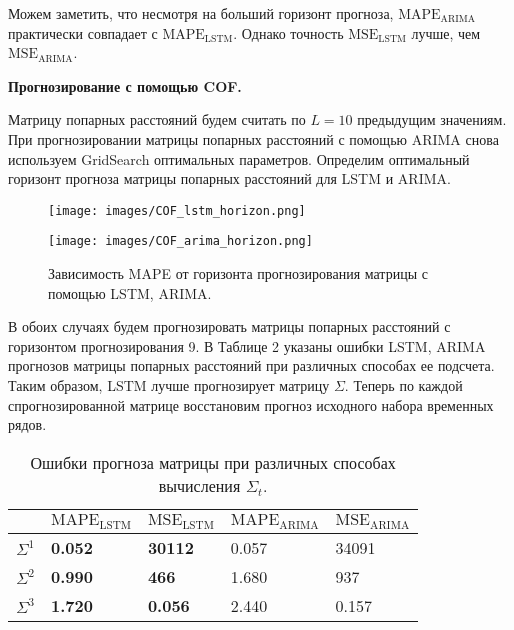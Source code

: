 \documentclass{article}
\begin{document}
Можем заметить, что несмотря на больший горизонт прогноза, $\text{MAPE}_{\text{ARIMA}}$ практически совпадает с $\text{MAPE}_{\text{LSTM}}$. Однако точность $\text{MSE}_{\text{LSTM}}$ лучше, чем $\text{MSE}_{\text{ARIMA}}$.

\textbf{Прогнозирование с помощью COF.}

Матрицу попарных расстояний будем считать по $L = 10$ предыдущим значениям. При прогнозировании матрицы попарных расстояний с помощью ARIMA снова используем GridSearch оптимальных параметров. Определим оптимальный горизонт прогноза матрицы попарных расстояний для LSTM и ARIMA.

\begin{figure}[h!]
  \begin{minipage}{0.5\textwidth}
    \centering
    \texttt{[image: images/COF\_lstm\_horizon.png]}
  \end{minipage}\hfill
  \begin{minipage}{0.5\textwidth}
    \centering
    \texttt{[image: images/COF\_arima\_horizon.png]}
  \end{minipage}
  \caption{Зависимость MAPE от горизонта прогнозирования матрицы с помощью LSTM, ARIMA.}
\end{figure}

В обоих случаях будем прогнозировать матрицы попарных расстояний с горизонтом прогнозирования 9. В Таблице 2 указаны ошибки LSTM, ARIMA прогнозов матрицы попарных расстояний при различных способах ее подсчета. Таким образом, LSTM лучше прогнозирует матрицу $\Sigma$. Теперь по каждой спрогнозированной матрице восстановим прогноз исходного набора временных рядов.

\begin{table}[h]
\centering
\begin{tabular}{|l|l|l|l|l|}
\hline  
         & $\text{MAPE}_{\text{LSTM}}$  & $\text{MSE}_{\text{LSTM}}$  & $\text{MAPE}_{\text{ARIMA}}$ & $\text{MSE}_{\text{ARIMA}}$\\ \hline
${\Sigma}^1$ & \textbf{0.052} & \textbf{30112} & 0.057 & 34091 \\ \hline
${\Sigma}^2$ & \textbf{0.990} & \textbf{466} & 1.680 & 937 \\ \hline
${\Sigma}^3$ & \textbf{1.720} & \textbf{0.056} & 2.440 & 0.157 \\ \hline
\end{tabular}
\caption{Ошибки прогноза матрицы при различных способах вычисления $\Sigma_t$.}
\label{tab:stat}
\end{table}
\end{document}
